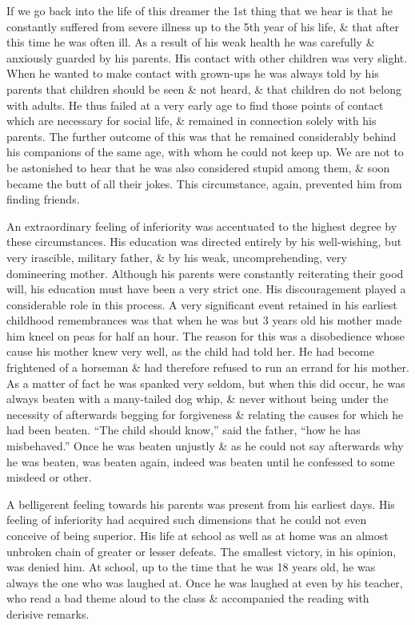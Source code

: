 \documentclass{article}
\begin{document}
If we go back into the life of this dreamer the 1st thing that we hear is that he constantly suffered from severe illness up to the 5th year of his life, \& that after this time he was often ill. As a result of his weak health he was carefully \& anxiously guarded by his parents. His contact with other children was very slight. When he wanted to make contact with grown-ups he was always told by his parents that children should be seen \& not heard, \& that children do not belong with adults. He thus failed at a very early age to find those points of contact which are necessary for social life, \& remained in connection solely with his parents. The further outcome of this was that he remained considerably behind his companions of the same age, with whom he could not keep up. We are not to be astonished to hear that he was also considered stupid among them, \& soon became the butt of all their jokes. This circumstance, again, prevented him from finding friends.

An extraordinary feeling of inferiority was accentuated to the highest degree by these circumstances. His education was directed entirely by his well-wishing, but very irascible, military father, \& by his weak, uncomprehending, very domineering mother. Although his parents were constantly reiterating their good will, his education must have been a very strict one. His discouragement played a considerable role in this process. A very significant event retained in his earliest childhood remembrances was that when he was but 3 years old his mother made him kneel on peas for half an hour. The reason for this was a disobedience whose cause his mother knew very well, as the child had told her. He had become frightened of a horseman \& had therefore refused to run an errand for his mother. As a matter of fact he was spanked very seldom, but when this did occur, he was always beaten with a many-tailed dog whip, \& never without being under the necessity of afterwards begging for forgiveness \& relating the causes for which he had been beaten. ``The child should know,'' said the father, ``how he has misbehaved.'' Once he was beaten unjustly \& as he could not say afterwards why he was beaten, was beaten again, indeed was beaten until he confessed to some misdeed or other.

A belligerent feeling towards his parents was present from his earliest days. His feeling of inferiority had acquired such dimensions that he could not even conceive of being superior. His life at school as well as at home was an almost unbroken chain of greater or lesser defeats. The smallest victory, in his opinion, was denied him. At school, up to the time that he was 18 years old, he was always the one who was laughed at. Once he was laughed at even by his teacher, who read a bad theme aloud to the class \& accompanied the reading with derisive remarks.
\end{document}
